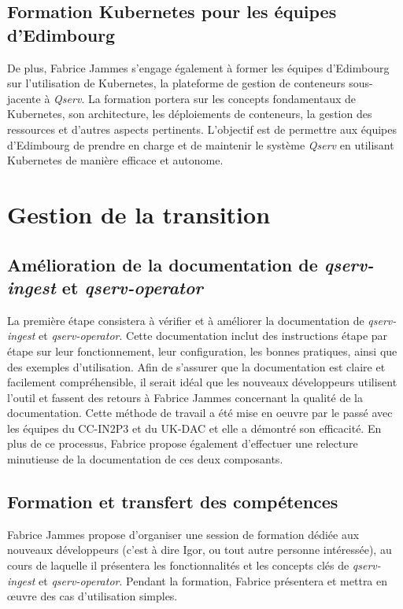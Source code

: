 \documentclass[french] {article}
\begin{document}
\subsection{Formation Kubernetes pour les équipes d'Edimbourg}

De plus, Fabrice Jammes  s'engage également à former les équipes d'Edimbourg sur l'utilisation de Kubernetes, la plateforme de gestion de conteneurs sous-jacente à \textit{Qserv}. La formation portera sur les
concepts fondamentaux de Kubernetes, son architecture, les déploiements de conteneurs, la gestion des ressources et d'autres aspects pertinents. L'objectif est de permettre aux équipes d'Edimbourg de prendre
en charge et de maintenir le système \textit{Qserv} en utilisant Kubernetes de manière efficace et autonome.

\section{Gestion de la transition}

\subsection{Amélioration de la documentation de \textit{qserv-ingest} et \textit{qserv-operator}}

La première étape consistera à vérifier et à améliorer la documentation de \textit{qserv-ingest} et \textit{qserv-operator}.
Cette documentation inclut des instructions étape par étape sur leur fonctionnement, leur configuration, les bonnes pratiques, ainsi que des exemples d'utilisation.
Afin de s'assurer que la documentation est claire et facilement compréhensible, il serait idéal que les nouveaux développeurs utilisent l'outil et fassent des retours à Fabrice Jammes concernant
la qualité de la documentation. Cette méthode de travail a été mise en oeuvre par le passé avec les équipes du CC-IN2P3 et du UK-DAC et elle a démontré son efficacité. En plus de ce processus,
Fabrice propose également d'effectuer une relecture minutieuse de la documentation de ces deux composants.

\subsection{Formation et transfert des compétences}

Fabrice Jammes propose d'organiser une session de formation dédiée aux nouveaux développeurs (c'est à dire Igor, ou tout autre personne intéressée), au cours de laquelle il présentera les fonctionnalités
et les concepts clés de \textit{qserv-ingest} et \textit{qserv-operator}. Pendant la formation, Fabrice présentera et mettra en œuvre des cas d'utilisation simples.
\end{document}
